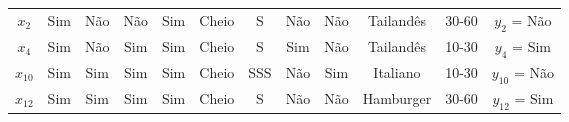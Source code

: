 \begin{center}
\begin{adjustbox}{max width=\textwidth}
\begin{tabular}{|cccccccccccc|}
        \multicolumn{1}{|c|}{${x_2}$}                     & \multicolumn{1}{|c|}{Sim}          & \multicolumn{1}{|c|}{Não} & \multicolumn{1}{|c|}{Não}         & \multicolumn{1}{|c|}{Sim}  & \multicolumn{1}{|c|}{Cheio}    & \multicolumn{1}{|c|}{S}     & \multicolumn{1}{|c|}{Não}   & \multicolumn{1}{|c|}{Não}     & \multicolumn{1}{|c|}{Tailandês}  & \multicolumn{1}{|c|}{30-60}       & \multicolumn{1}{|c|}{$y_2$ = Não}                     \\ 
        \multicolumn{1}{|c|}{${x_4}$}                     & \multicolumn{1}{|c|}{Sim}          & \multicolumn{1}{|c|}{Não} & \multicolumn{1}{|c|}{Sim}         & \multicolumn{1}{|c|}{Sim}  & \multicolumn{1}{|c|}{Cheio}    & \multicolumn{1}{|c|}{S}     & \multicolumn{1}{|c|}{Sim}   & \multicolumn{1}{|c|}{Não}     & \multicolumn{1}{|c|}{Tailandês}  & \multicolumn{1}{|c|}{10-30}       & \multicolumn{1}{|c|}{$y_4$ = Sim}                     \\ 
        \multicolumn{1}{|c|}{${x_{10}}$}                    & \multicolumn{1}{|c|}{Sim}          & \multicolumn{1}{|c|}{Sim} & \multicolumn{1}{|c|}{Sim}         & \multicolumn{1}{|c|}{Sim}  & \multicolumn{1}{|c|}{Cheio}    & \multicolumn{1}{|c|}{SSS}   & \multicolumn{1}{|c|}{Não}   & \multicolumn{1}{|c|}{Sim}     & \multicolumn{1}{|c|}{Italiano}   & \multicolumn{1}{|c|}{10-30}       & \multicolumn{1}{|c|}{$y_{10}$ = Não}                  \\ 
        \multicolumn{1}{|c|}{$x_{12}$}                    & \multicolumn{1}{|c|}{Sim}          & \multicolumn{1}{|c|}{Sim} & \multicolumn{1}{|c|}{Sim}         & \multicolumn{1}{|c|}{Sim}  & \multicolumn{1}{|c|}{Cheio}    & \multicolumn{1}{|c|}{S}     & \multicolumn{1}{|c|}{Não}   & \multicolumn{1}{|c|}{Não}     & \multicolumn{1}{|c|}{Hamburger}  & \multicolumn{1}{|c|}{30-60}       & \multicolumn{1}{|c|}{$y_{12}$ = Sim}                  \\ \hline
    \end{tabular}
    \end{adjustbox}
\end{center}
    

